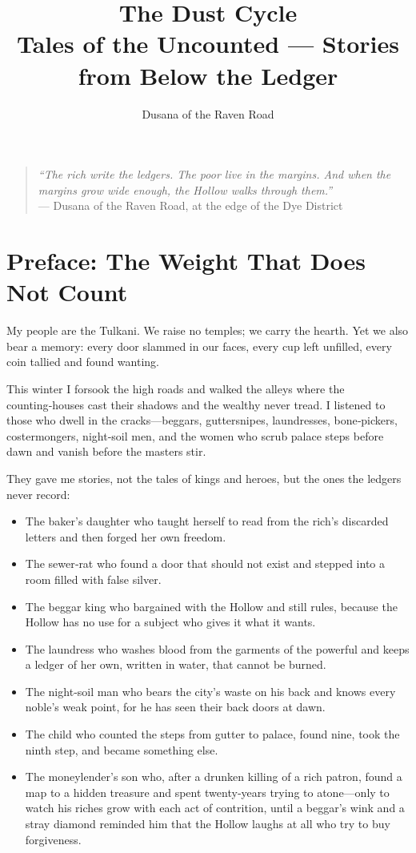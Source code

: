 \documentclass[11pt]{article}
\title{The Dust Cycle\\\large Tales of the Uncounted — Stories from Below the Ledger}
\author{Dusana of the Raven Road}
\date{}
\begin{document}
\begin{quote}
\textit{``The rich write the ledgers. The poor live in the margins. And when the margins grow wide enough, the Hollow walks through them.''}\\
— Dusana of the Raven Road, at the edge of the Dye District
\end{quote}

\section*{Preface: The Weight That Does Not Count}
My people are the Tulkani. We raise no temples; we carry the hearth. Yet we also bear a memory: every door slammed in our faces, every cup left unfilled, every coin tallied and found wanting.

This winter I forsook the high roads and walked the alleys where the counting‑houses cast their shadows and the wealthy never tread. I listened to those who dwell in the cracks—beggars, guttersnipes, laundresses, bone‑pickers, costermongers, night‑soil men, and the women who scrub palace steps before dawn and vanish before the masters stir.

They gave me stories, not the tales of kings and heroes, but the ones the ledgers never record:

\begin{itemize}
\item The baker's daughter who taught herself to read from the rich’s discarded letters and then forged her own freedom.
\item The sewer‑rat who found a door that should not exist and stepped into a room filled with false silver.
\item The beggar king who bargained with the Hollow and still rules, because the Hollow has no use for a subject who gives it what it wants.
\item The laundress who washes blood from the garments of the powerful and keeps a ledger of her own, written in water, that cannot be burned.
\item The night‑soil man who bears the city’s waste on his back and knows every noble’s weak point, for he has seen their back doors at dawn.
\item The child who counted the steps from gutter to palace, found nine, took the ninth step, and became something else.
\item The moneylender’s son who, after a drunken killing of a rich patron, found a map to a hidden treasure and spent twenty‑years trying to atone—only to watch his riches grow with each act of contrition, until a beggar’s wink and a stray diamond reminded him that the Hollow laughs at all who try to buy forgiveness.
\end{itemize}
\end{document}
